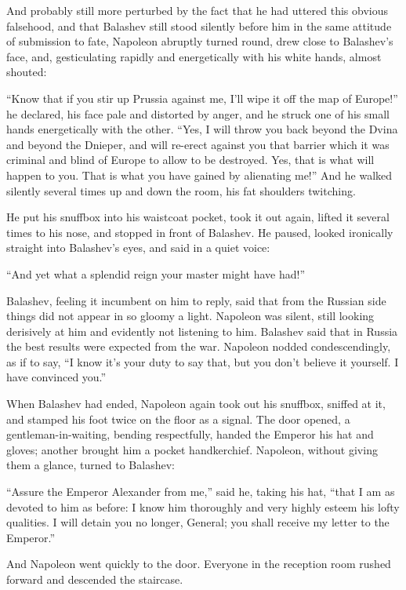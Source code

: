 And probably still more perturbed by the fact that he had uttered
this obvious falsehood, and that Balashev still stood silently
before him in the same attitude of submission to fate, Napoleon
abruptly turned round, drew close to Balashev's face, and,
gesticulating rapidly and energetically with his white hands,
almost shouted:

``Know that if you stir up Prussia against me, I'll wipe it off
the map of Europe!'' he declared, his face pale and distorted by
anger, and he struck one of his small hands energetically with
the other. ``Yes, I will throw you back beyond the Dvina and
beyond the Dnieper, and will re-erect against you that barrier
which it was criminal and blind of Europe to allow to be
destroyed. Yes, that is what will happen to you. That is what you
have gained by alienating me!'' And he walked silently several
times up and down the room, his fat shoulders twitching.

He put his snuffbox into his waistcoat pocket, took it out again,
lifted it several times to his nose, and stopped in front of
Balashev. He paused, looked ironically straight into Balashev's
eyes, and said in a quiet voice:

``And yet what a splendid reign your master might have had!''

Balashev, feeling it incumbent on him to reply, said that from
the Russian side things did not appear in so gloomy a
light. Napoleon was silent, still looking derisively at him and
evidently not listening to him. Balashev said that in Russia the
best results were expected from the war. Napoleon nodded
condescendingly, as if to say, ``I know it's your duty to say
that, but you don't believe it yourself. I have convinced you.''

When Balashev had ended, Napoleon again took out his snuffbox,
sniffed at it, and stamped his foot twice on the floor as a
signal. The door opened, a gentleman-in-waiting, bending
respectfully, handed the Emperor his hat and gloves; another
brought him a pocket handkerchief. Napoleon, without giving them
a glance, turned to Balashev:

``Assure the Emperor Alexander from me,'' said he, taking his
hat, ``that I am as devoted to him as before: I know him
thoroughly and very highly esteem his lofty qualities. I will
detain you no longer, General; you shall receive my letter to the
Emperor.''

And Napoleon went quickly to the door. Everyone in the reception
room rushed forward and descended the staircase.

